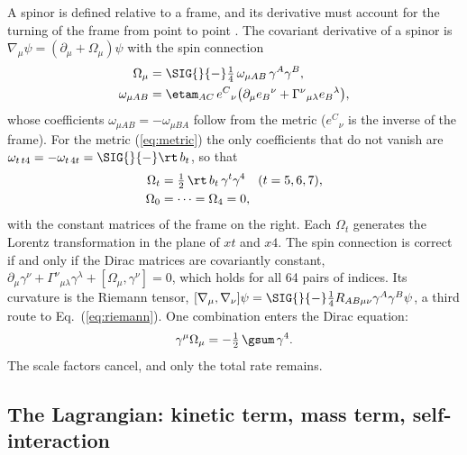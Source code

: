 A spinor is defined relative to a frame, and its derivative must account for the turning of the frame
from point to point \cite{BrillWheeler1957}. The covariant derivative of a spinor is
$\nabla_\mu\psi=(\partial_\mu+\Omega_\mu)\psi$ with the spin connection
\begin{equation}
\begin{aligned}
\Omega_\mu&=\SIG{}{-}\tfrac14\,\omega_{\mu AB}\,\gamma^{A}\gamma^{B},\\
\omega_{\mu AB}&=\etam_{AC}\,e^{C}{}_{\nu}\big(\partial_\mu e_B{}^{\nu}+\Gamma^{\nu}{}_{\mu\lambda}e_B{}^{\lambda}\big),
\end{aligned}
\label{eq:spindef}
\end{equation}
whose coefficients $\omega_{\mu AB}=-\omega_{\mu BA}$ follow from the metric ($e^{C}{}_{\nu}$ is
the inverse of the frame). For the
metric (\ref{eq:metric}) the only coefficients that do not vanish are
$\omega_{t\,t4}=-\omega_{t\,4t}=\SIG{}{-}\rt\,b_t$, so that
\begin{equation}
\begin{aligned}
\Omega_t&=\tfrac12\,\rt\,b_t\,\gamma^{t}\gamma^{4}\quad(t=5,6,7),\\
\Omega_0&=\dots=\Omega_4=0,
\end{aligned}
\label{eq:spinconn}
\end{equation}
with the constant matrices of the frame on the right. Each $\Omega_t$ generates the Lorentz
transformation in the plane of $xt$ and $x4$. The spin connection is correct if and only if the
Dirac matrices are covariantly constant,
$\partial_\mu\gamma^{\nu}+\Gamma^{\nu}{}_{\mu\lambda}\gamma^{\lambda}+[\Omega_\mu,\gamma^{\nu}]=0$,
which holds for all 64 pairs of indices. Its curvature is the Riemann tensor,
$[\nabla_\mu,\nabla_\nu]\psi=\SIG{}{-}\tfrac14R_{AB\mu\nu}\gamma^{A}\gamma^{B}\psi$, a third route to
Eq.~(\ref{eq:riemann}). One combination enters the Dirac equation:
\begin{equation}
\gamma^{\mu}\Omega_\mu=-\tfrac12\,\gsum\,\gamma^{4} .
\label{eq:gammaomega}
\end{equation}
The scale factors cancel, and only the total rate remains.

\subsection{The Lagrangian: kinetic term, mass term, self-interaction}
\label{sec:lagrangian}

